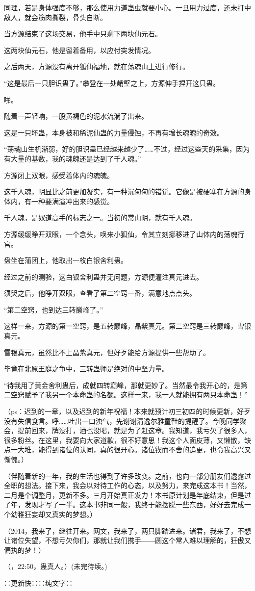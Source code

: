 \begin{this_body}
同理，若是身体强度不够，那么使用力道蛊虫就要小心。一旦用力过度，还未打中敌人，就会筋肉撕裂，骨头自断。

当方源结束了这场交易，他手中只剩下两块仙元石。

这两块仙元石，他是留着备用，以应付突发情况。

之后两天，方源没有离开狐仙福地，就在荡魂山上进行修行。

“这是最后一只胆识蛊了。”攀登在一处峭壁之上，方源伸手捏开这只蛊。

啪。

随着一声轻响，一股黄褐色的泥水流淌了出来。

这是一只坏蛊，本身被和稀泥仙蛊的力量侵蚀，不再有增长魂魄的奇效。

“荡魂山生机渐弱，好的胆识蛊已经越来越少了……不过，经过这些天的采集，因为有大量的基数，我的魂魄还是达到了千人魂。”

方源闭上双眼，感受着体内的魂魄。

这千人魂，明显比之前更加凝实，有一种沉甸甸的错觉。它像是被硬塞在方源的身体内，有一种要满溢冲出来的感觉。

千人魂，是奴道高手的标志之一。当初的常山阴，就有千人魂。

方源缓缓睁开双眼，一个念头，唤来小狐仙，令其立刻挪移进了山体内的荡魂行宫。

盘坐在蒲团上，他取出一枚白银舍利蛊。

经过之前的测验，这白银舍利蛊并无问题，方源便灌注真元进去。

须臾之后，他睁开双眼，查看了第二空窍一番，满意地点点头。

“第二空窍，也到达三转巅峰了。”

这样一来，方源的第一空窍，是五转巅峰，晶紫真元。第二空窍是三转巅峰，雪银真元。

雪银真元，虽然比不上晶紫真元，但好歹能给方源提供一些帮助了。

毕竟在北原王庭之争中，三转蛊师是绝对的中坚力量。

“待我用了黄金舍利蛊后，成就四转巅峰，那就更妙了。当然最令我开心的，是第二空窍赋予了我另一个本命蛊的名额。这样一来，我一人就能拥有两只本命蛊！”

（ps：迟到的一章，以及迟到的新年祝福！本来就预计初三初四的时候更新，好歹没有失信食言。呼……吐出一口浊气，先谢谢清逸尔雅童鞋的提醒了。今晚同学聚会，提前回来，牌没打，酒也没喝，就是为了赶这章。我知道，我亏欠了很多人，很多粉丝。在这里，我要向大家道歉，很不好意思！我这个人面皮薄，又懒散，缺点一大堆，能得到诸位的认同，真的很开心。诸位锲而不舍的追更，也令我高兴又惭愧。）

（伴随着新的一年，我的生活也得到了许多改变。之前，也向一部分朋友们透露过全职的想法。接下来，我会以对待工作的心态，以及努力，来完成这本书！当然，二月是个调整月，更新不多。三月开始真正发力！本书原计划是年底结束，但是过了年，发现才写了一半。这本书非同一般，我终于能摆脱一些东西，好好去完成一个幼稚狂妄却又真实的梦想。）

（2014，我来了，继往开来。网文，我来了，两只脚踏进来。诸君，我来了，不想让诸位失望，不想亏欠你们，那就让我们携手――圆这个常人难以理解的，狂傲又偏执的梦！）

（，22:50，蛊真人。）(未完待续。)

∷更新快∷∷纯文字∷

\end{this_body}

